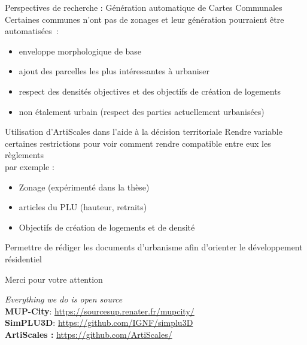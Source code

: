 \documentclass[xcolor=table]{beamer}
\begin{document}
\begin{frame}{Perspectives de recherche : Génération automatique de Cartes Communales}
	Certaines communes n'ont pas de zonages et leur génération pourraient être automatisées~:
	\begin{itemize}
		\item<2-> enveloppe morphologique de base
		\item<3-> ajout des parcelles les plus intéressantes à urbaniser 
		\item<4-> respect des densités objectives et des objectifs de création de logements
		\item<5-> non étalement urbain (respect des parties actuellement urbanisées)
	\end{itemize}
\end{frame}

\begin{frame}{Utilisation d'ArtiScales dans l'aide à la décision territoriale}
	Rendre variable certaines restrictions pour voir comment rendre compatible entre eux les règlements
	\\
	par exemple : 
	\begin{itemize}
		\item Zonage (expérimenté dans la thèse)
		\item articles du PLU (hauteur, retraits)
		\item Objectifs de création de logements et de densité
	\end{itemize}
\end{frame}


	Permettre de rédiger les documents d'urbanisme afin d'orienter le développement résidentiel
\begin{frame}[standout]
	\centering
	\begin{block}{}	
		\centering	
		Merci pour votre attention
	\end{block}
	\begin{block}{}
		\centering
		\textit{Everything we do is open source}\\
		\large
		\textbf{MUP-City}: \url{https://sourcesup.renater.fr/mupcity/} \\
		\textbf{SimPLU3D}: \url{https://github.com/IGNF/simplu3D}\\
		\textbf{ArtiScales :} \url{https://github.com/ArtiScales/}
	\end{block}
\end{frame}
\end{document}
